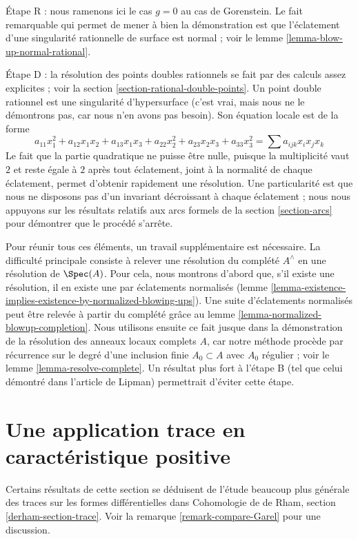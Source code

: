 \medskip\noindent Étape R : nous ramenons ici le cas $g = 0$ au cas de Gorenstein. Le fait remarquable qui permet de mener à bien la démonstration est que l'éclatement d'une singularité rationnelle de surface est normal ; voir le lemme \ref{lemma-blow-up-normal-rational}.

\medskip\noindent Étape D : la résolution des points doubles rationnels se fait par des calculs assez explicites ; voir la section \ref{section-rational-double-points}. Un point double rationnel est une singularité d'hypersurface (c'est vrai, mais nous ne le démontrons pas, car nous n'en avons pas besoin). Son équation locale est de la forme $$
a_{11} x_1^2 + a_{12} x_1x_2 + a_{13}x_1x_3 + a_{22} x_2^2 +
a_{23} x_2x_3 + a_{33} x_3^2 =
\sum a_{ijk} x_ix_jx_k
$$ Le fait que la partie quadratique ne puisse être nulle, puisque la multiplicité vaut $2$ et reste égale à $2$ après tout éclatement, joint à la normalité de chaque éclatement, permet d'obtenir rapidement une résolution. Une particularité est que nous ne disposons pas d'un invariant décroissant à chaque éclatement ; nous nous appuyons sur les résultats relatifs aux arcs formels de la section \ref{section-arcs} pour démontrer que le procédé s'arrête.

\medskip\noindent Pour réunir tous ces éléments, un travail supplémentaire est nécessaire. La difficulté principale consiste à relever une résolution du complété $A^\wedge$ en une résolution de $\Spec(A)$. Pour cela, nous montrons d'abord que, s'il existe une résolution, il en existe une par éclatements normalisés (lemme \ref{lemma-existence-implies-existence-by-normalized-blowing-ups}). Une suite d'éclatements normalisés peut être relevée à partir du complété grâce au lemme \ref{lemma-normalized-blowup-completion}. Nous utilisons ensuite ce fait jusque dans la démonstration de la résolution des anneaux locaux complets $A$, car notre méthode procède par récurrence sur le degré d'une inclusion finie $A_0 \subset A$ avec $A_0$ régulier ; voir le lemme \ref{lemma-resolve-complete}. Un résultat plus fort à l'étape B (tel que celui démontré dans l'article de Lipman) permettrait d'éviter cette étape.




\section{Une application trace en caractéristique positive} \label{section-trace}

\noindent Certains résultats de cette section se déduisent de l'étude beaucoup plus générale des traces sur les formes différentielles dans Cohomologie de de Rham, section \ref{derham-section-trace}. Voir la remarque \ref{remark-compare-Garel} pour une discussion.

